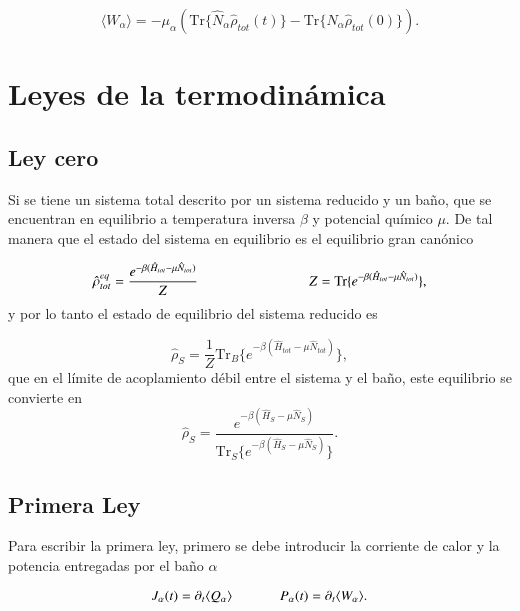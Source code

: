 \begin{equation}
    \langle W_{\alpha}\rangle = - \mu_{\alpha} (\text{Tr}\{\hat{N}_{\alpha} \hat{\rho}_{tot}(t) \} - \text{Tr}\{\hat{N}_{\alpha}\hat{\rho}_{tot}(0) \}  ).
    \label{sec3:trabajo}
\end{equation}
\label{sec3workheat}

\newpage

\section{Leyes de la termodinámica}
\label{Leyestermo}
\subsection{Ley cero}
Si se tiene un sistema total descrito por un sistema reducido y un baño, que se encuentran en equilibrio a temperatura inversa $\beta$ y potencial químico $\mu$. De tal manera que el estado del sistema en equilibrio es el equilibrio gran canónico

\begin{equation*}
    \hat{\rho}^{eq}_{tot} = \frac{e^{-\beta(\hat{H}_{tot} - \mu \hat{N}_{tot})}}{Z}  \hspace{28mm} Z = \text{Tr}\{e^{-\beta(\hat{H}_{tot} - \mu \hat{N}_{tot})} \},
\end{equation*}
y por lo tanto el estado de equilibrio del sistema reducido es

\begin{equation*}
    \hat{\rho}_{S} = \frac{1}{Z}\text{Tr}_{B}\{ e^{-\beta(\hat{H}_{tot} - \mu \hat{N}_{tot})} \},
\end{equation*}
que en el límite de acoplamiento débil entre el sistema y el baño, este equilibrio se convierte en \cite{geva2000second}
\begin{equation*}
    \hat{\rho}_{S} = \frac{e^{-\beta(\hat{H}_{S} - \mu\hat{N}_{S})}}{\text{Tr}_{S}\{e^{-\beta(\hat{H}_{S} - \mu \hat{N}_{S})} \} }.
\end{equation*}

\subsection{Primera Ley}
Para escribir la primera ley, primero se debe introducir la corriente de calor y la potencia entregadas por el baño $\alpha$

\begin{equation*}
    J_{\alpha}(t) = \partial_{t}\langle Q_{\alpha}\rangle \hspace{12mm}  P_{\alpha}(t) = \partial_{t}\langle W_{\alpha}\rangle.
\end{equation*}

